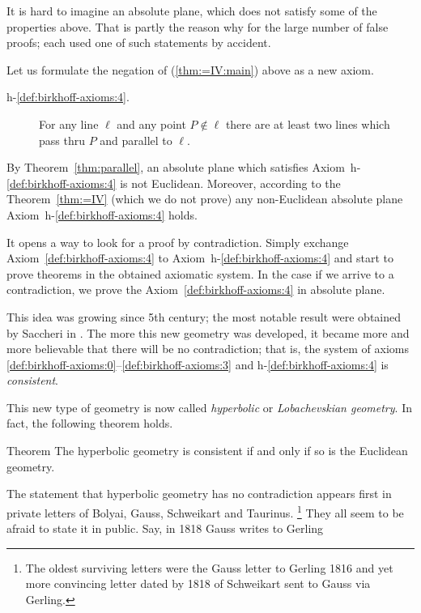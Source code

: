 It is hard to imagine an absolute plane, which does not satisfy some of the properties above.
That is partly the reason why for the large number of false proofs;
each used one of such statements by accident.

Let us formulate the negation of (\ref{thm:=IV:main}) above as a new axiom.


\begin{framed}
\begin{description}
\item[{\rm h-$\!$\ref{def:birkhoff-axioms:4}.}]\label{def:hyperbolic-4a}  
For any line $\ell$ and any point $P\notin\ell$ 
there are at least two lines which pass thru $P$ 
and parallel to $\ell$.
\end{description}
\end{framed}

By Theorem~\ref{thm:parallel}, an absolute plane which satisfies Axiom~h-$\!$\ref{def:birkhoff-axioms:4} is not Euclidean. 
Moreover, according to the Theorem~\ref{thm:=IV} (which we do not prove) 
any non-Euclidean absolute plane Axiom~h-$\!$\ref{def:birkhoff-axioms:4} holds.

It opens a way to look for a proof by contradiction.
Simply exchange  Axiom~\ref{def:birkhoff-axioms:4} to Axiom~h-$\!$\ref{def:birkhoff-axioms:4}
 and start to prove theorems in the obtained axiomatic system.
In the case if we arrive to a contradiction, 
we prove the Axiom~\ref{def:birkhoff-axioms:4} in absolute plane.  

This idea was growing since 5th century;
the most notable result were obtained by Saccheri in \cite{saccheri}.
The more this new geometry was developed,
it became more and more believable that there will be no contradiction;
that is, the system of axioms \ref{def:birkhoff-axioms:0}--\ref{def:birkhoff-axioms:3} and h-$\!$\ref{def:birkhoff-axioms:4} is \emph{consistent}.

This new type of geometry is now called \emph{hyperbolic} or  \emph{Lobachevskian geometry}.
In fact, the following theorem holds.

\begin{thm}{Theorem}\label{thm:consistent}
The hyperbolic geometry is consistent if and only if so is the Euclidean geometry.
\end{thm}

The statement
that hyperbolic geometry has no contradiction appears first in private letters of
Bolyai,  Gauss, Schweikart and Taurinus.%
\footnote{The oldest surviving letters were the Gauss letter to Gerling 1816 
and yet more convincing letter dated by 1818 
of Schweikart sent to Gauss via Gerling.}
They all seem to be afraid to state it in public.
Say, in 1818  
Gauss writes to Gerling

